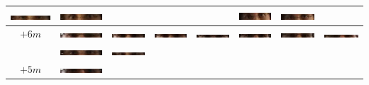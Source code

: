 \begin{tabular}{|c|c|c|c|c|c|c|c|}
\includegraphics[width=0.115\linewidth]{Auge1/A_Img7-1ThomasE.png} &
\includegraphics[width=0.115\linewidth]{Auge1/A_Img7-2ThomasE.png} &
&
&
&
\includegraphics[width=0.115\linewidth]{Auge1/A_Img7-6ThomasE.png} &
\includegraphics[width=0.115\linewidth]{Auge1/A_Img7-7ThomasE.png} \\\hline 
$+6m$&
\includegraphics[width=0.115\linewidth]{Auge1/A_Img6-1FalkoE.png} &
\includegraphics[width=0.115\linewidth]{Auge1/A_Img6-2FalkoE.png} &
\includegraphics[width=0.115\linewidth]{Auge1/A_Img6-3FalkoE.png} &
\includegraphics[width=0.115\linewidth]{Auge1/A_Img6-4FalkoE.png} &
\includegraphics[width=0.115\linewidth]{Auge1/A_Img6-5FalkoE.png} &
\includegraphics[width=0.115\linewidth]{Auge1/A_Img6-6FalkoE.png} &
\includegraphics[width=0.115\linewidth]{Auge1/A_Img6-7FalkoE.png} \\&
\includegraphics[width=0.115\linewidth]{Auge1/A_Img6-1ThomasE.png} &
\includegraphics[width=0.115\linewidth]{Auge1/A_Img6-2ThomasE.png} &
&
&
&
&
\\\hline 
$+5m$&
\includegraphics[width=0.115\linewidth]{Auge1/A_Img5-1FalkoE.png} &

\end{tabular}
